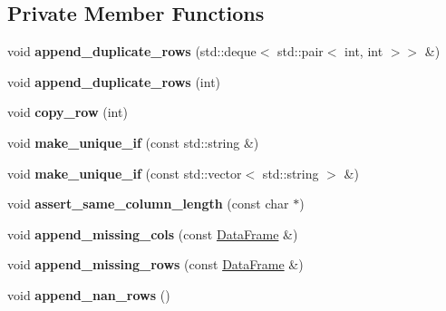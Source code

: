 \subsection*{Private Member Functions}
\begin{DoxyCompactItemize}
\item 
\mbox{\label{classDataFrame_a7c3a5ee79678ae22cdfaf51d6a02e536}} 
void {\bfseries append\+\_\+duplicate\+\_\+rows} (std\+::deque$<$ std\+::pair$<$ int, int $>$$>$ \&)
\item 
\mbox{\label{classDataFrame_aee52488afb8455d8b49786a3b8629249}} 
void {\bfseries append\+\_\+duplicate\+\_\+rows} (int)
\item 
\mbox{\label{classDataFrame_ad44e1c50bc67dc453a02bbcdf7b13a98}} 
void {\bfseries copy\+\_\+row} (int)
\item 
\mbox{\label{classDataFrame_a8454f81fa6854f280c48672214224160}} 
void {\bfseries make\+\_\+unique\+\_\+if} (const std\+::string \&)
\item 
\mbox{\label{classDataFrame_a2bb66e58b8b8153d4ae7c5e640f0fab4}} 
void {\bfseries make\+\_\+unique\+\_\+if} (const std\+::vector$<$ std\+::string $>$ \&)
\item 
\mbox{\label{classDataFrame_ae996ebef2abb39f125adc2cdff8846aa}} 
void {\bfseries assert\+\_\+same\+\_\+column\+\_\+length} (const char $\ast$)
\item 
\mbox{\label{classDataFrame_a56acb2da2d421ca0d28324a069593e23}} 
void {\bfseries append\+\_\+missing\+\_\+cols} (const \hyperlink{classDataFrame}{Data\+Frame} \&)
\item 
\mbox{\label{classDataFrame_a5e5818b6152d279647995f528fbb5ca0}} 
void {\bfseries append\+\_\+missing\+\_\+rows} (const \hyperlink{classDataFrame}{Data\+Frame} \&)
\item 
\mbox{\label{classDataFrame_a8f22d43916f61216b13a36843941d1a6}} 
void {\bfseries append\+\_\+nan\+\_\+rows} ()
\item 
\mbox{\label{classDataFrame_aec1676a627594d227b776cf78fad9825}} 
$$
\end{DoxyCompactItemize}
